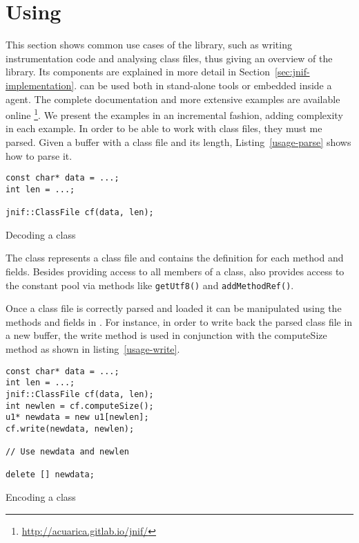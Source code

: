 \section{Using \jnif{}}\label{sec:jnif-usage}

This section shows common use cases of the \jnif{} library, 
such as writing instrumentation code and analysing class files, 
thus giving an overview of the library.
Its components are explained in more detail in Section~\ref{sec:jnif-implementation}.
\jnif{} can be used both in stand-alone tools or
embedded inside a \jvmti{} agent.
The complete \api{} documentation and more extensive examples are available online%
\footnote{\url{http://acuarica.gitlab.io/jnif/}}.
We present the examples in an incremental fashion,
adding complexity in each example.
In order to be able to work with class files, they must me parsed. 
Given a buffer with a class file and its length,
Listing~\ref{usage-parse} shows how to parse it.

\begin{listing}
\begin{verbatim}
const char* data = ...;
int len = ...;

jnif::ClassFile cf(data, len);
\end{verbatim}
\caption{Decoding a class}
\label{usage-parse}
\end{listing}

The class  represents a \java{} class file and contains the definition for each method and fields. 
Besides providing access to all members of a class,
 also provides access to the constant pool
via methods like \texttt{getUtf8()} and \texttt{addMethodRef()}.

Once a class file is correctly parsed and loaded it can be manipulated using the methods and fields in .
For instance, in order to write back the parsed class file in a new buffer, the write method is used in conjunction with the computeSize method as shown in listing~\ref{usage-write}.

\begin{listing}
\begin{verbatim}
const char* data = ...;
int len = ...;
jnif::ClassFile cf(data, len);
int newlen = cf.computeSize();
u1* newdata = new u1[newlen];
cf.write(newdata, newlen);

// Use newdata and newlen

delete [] newdata;
\end{verbatim}
\caption{Encoding a class}
\label{usage-write}
\end{listing}

